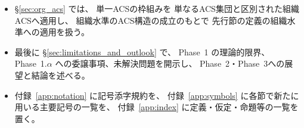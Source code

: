\begin{itemize}
  \item \S\ref{sec:org_acs} では、
    単一ACSの枠組みを
    単なるACS集団と区別された組織ACSへ適用し、
    組織水準のACS構造の成立のもとで
    先行節の定義の組織水準への適用を扱う。

  \item 最後に \S\ref{sec:limitations_and_outlook} で、
    Phase~1 の理論的限界、Phase~1.$\alpha$ への委譲事項、未解決問題を開示し、
    Phase~2・Phase~3への展望と結論を述べる。

  \item 付録~\ref{app:notation} に記号添字規約を、
    付録~\ref{app:symbols} に各節で新たに用いる主要記号の一覧を、
    付録~\ref{app:index} に定義・仮定・命題等の一覧を置く。

\end{itemize}
